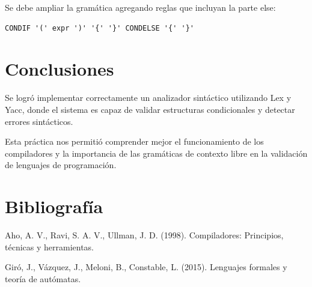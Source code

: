 \documentclass{article}
\begin{document}
Se debe ampliar la gramática agregando reglas que incluyan la parte else:
\begin{verbatim}
CONDIF '(' expr ')' '{' '}' CONDELSE '{' '}'
\end{verbatim}

\section{Conclusiones}

Se logró implementar correctamente un analizador sintáctico utilizando Lex y Yacc, donde el sistema es capaz de validar estructuras condicionales y detectar errores sintácticos.

Esta práctica nos permitió comprender mejor el funcionamiento de los compiladores y la importancia de las gramáticas de contexto libre en la validación de lenguajes de programación.

\section{Bibliografía}

Aho, A. V., Ravi, S. A. V., Ullman, J. D. (1998). Compiladores: Principios, técnicas y herramientas.

Giró, J., Vázquez, J., Meloni, B., Constable, L. (2015). Lenguajes formales y teoría de autómatas.
\end{document}

